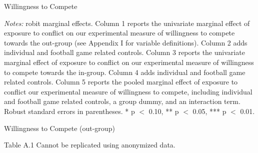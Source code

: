 \documentclass[10pt,a4paper]{scrartcl} %
\begin{document}
\begin{table}[p!]
\centering
\caption{Willingness to Compete}
\label{tab:slf:compete}
\begin{threeparttable}
  \singlespacing
  \small
  
  \begin{tablenotes}
    \footnotesize
    \item \textit{Notes:} robit marginal effects. Column 1 reports the univariate marginal effect of exposure to conflict on our experimental measure of willingness to compete towards the out-group (see Appendix I for variable definitions). Column 2 adds individual and football game related controls. Column 3 reports the univariate marginal effect of exposure to conflict on our experimental measure of willingness to compete towards the in-group. Column 4 adds individual and football game related controls. Column 5 reports the pooled marginal effect of exposure to conflict our experimental measure of willingness to compete, including individual and football game related controls, a group dummy, and an interaction term. Robust standard errors in parentheses. * p $<$ 0.10, ** p $<$ 0.05, *** p $<$ 0.01.
    \item
  \end{tablenotes}
\end{threeparttable}
\end{table}



\setcounter{table}{0}
\renewcommand{\thetable}{A\arabic{table}}

\begin{table}[htp]
  \caption{Willingness to Compete (out-group)}
  \label{tab:slf:compete_fe}
  Table A.1 Cannot be replicated using anonymized data.
\end{table}

\pagebreak
\end{document}
